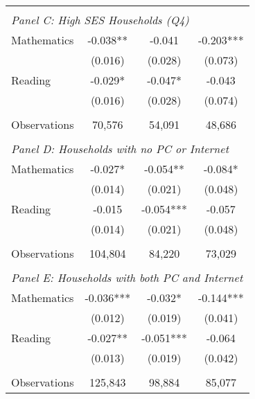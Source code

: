 {\begin{tabular}{lccc}
&  &  &   \\
\multicolumn{4}{l}{\textit{Panel C: High SES Households (Q4)}} \\
\hspace{3mm}Mathematics&      -0.038** &      -0.041   &      -0.203***\\
                    &     (0.016)   &     (0.028)   &     (0.073)   \\
 
\hspace{3mm}Reading &      -0.029*  &      -0.047*  &      -0.043   \\
                    &     (0.016)   &     (0.028)   &     (0.074)   \\
                    &               &               &               \\
\hspace{3mm}Observations&      70,576   &      54,091   &      48,686   \\
 
&  &  &   \\
\multicolumn{4}{l}{\textit{Panel D: Households with no PC or Internet}} \\
\hspace{3mm}Mathematics&      -0.027*  &      -0.054** &      -0.084*  \\
                    &     (0.014)   &     (0.021)   &     (0.048)   \\
 
\hspace{3mm}Reading &      -0.015   &      -0.054***&      -0.057   \\
                    &     (0.014)   &     (0.021)   &     (0.048)   \\
                    &               &               &               \\
\hspace{3mm}Observations&     104,804   &      84,220   &      73,029   \\
 
&  &  &   \\
\multicolumn{4}{l}{\textit{Panel E: Households with both PC and Internet}} \\
\hspace{3mm}Mathematics&      -0.036***&      -0.032*  &      -0.144***\\
                    &     (0.012)   &     (0.019)   &     (0.041)   \\
 
\hspace{3mm}Reading &      -0.027** &      -0.051***&      -0.064   \\
                    &     (0.013)   &     (0.019)   &     (0.042)   \\
                    &               &               &               \\
\hspace{3mm}Observations&     125,843   &      98,884   &      85,077   \\
 

\bottomrule
\end{tabular}
}
